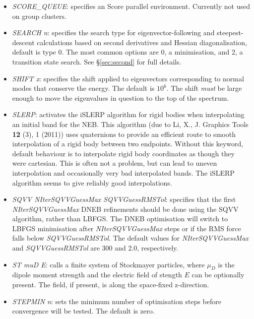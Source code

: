 \documentclass[12pt,a4paper,dvips]{article}
\begin{document}
\begin{itemize}
\item {\it SCORE\_QUEUE\/}: specifies an Score parallel environment. 
Currently not used on group clusters.

\item {\it SEARCH n\/}: specifies the search type for eigenvector-following and
steepest-descent calculations based on second derivatives and Hessian diagonalisation, default is type 0.
The most common options are 0, a minimisation, and 2, a transition state search. See
\S\ref{sec:second} for full details.

\item {\it SHIFT x\/}: specifies the shift applied to eigenvectors corresponding
to normal modes that conserve the energy. The default is $10^6$. The shift {\it must\/} be
large enough to move the eigenvalues in question to the top of the spectrum.

\item {\it SLERP\/}: activates the iSLERP algorithm for rigid bodies when interpolating an initial band for the NEB. This algorithm (due to Li, X., J. Graphics Tools {\bf 12} (3), 1 (2011)) uses quaternions to provide an efficient route to smooth interpolation of a rigid body between two endpoints. Without this keyword, default behaviour is to interpolate rigid body coordinates as though they were cartesian. This is often not a problem, but can lead to uneven interpolation and occasionally very bad interpolated bands. The iSLERP algorithm seems to give reliably good interpolations.

\item {\it SQVV NIterSQVVGuessMax SQVVGuessRMSTol\/}:
specifies that the first {\it NIterSQVVGuessMax\/} DNEB refinements should be
done using the SQVV algorithm, rather than LBFGS.\cite{TrygubenkoW04}
The DNEB optimisation will switch to LBFGS minimisation after {\it NIterSQVVGuessMax\/}
steps or if the RMS force falls below {\it SQVVGuessRMSTol\/}.
The default values for {\it NIterSQVVGuessMax\/} and {\it SQVVGuessRMSTol\/}
are 300 and 2.0, respectively.

\item {\it ST muD E\/}: calls a finite system of Stockmayer particles,
where $\mu_{D}$ is the dipole moment strength and the electric field of stength $E$ can be optionally present. The field, if
present, is along the space-fixed z-direction.

\item {\it STEPMIN n\/}: sets the minimum number of optimisation steps before convergence
will be tested. The default is zero.


\end{itemize}
\end{document}
